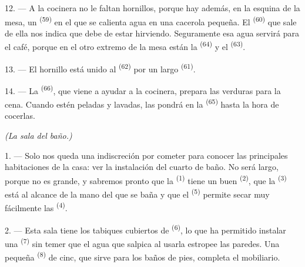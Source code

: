 12. --- A la cocinera no le faltan hornillos, porque hay además, en la
esquina de la mesa, un  \textsuperscript{(59)} en el que se
calienta agua en una cacerola pequeña. El  \textsuperscript{(60)} que
sale de ella nos indica que debe de estar hirviendo. Seguramente esa agua
servirá para el café, porque en el otro extremo de la mesa están la
 \textsuperscript{(64)} y el  \textsuperscript{(63)}.

13. --- El hornillo está unido al  \textsuperscript{(62)} por
un largo  \textsuperscript{(61)}.

14. --- La  \textsuperscript{(66)}, que viene a ayudar a la
cocinera, prepara las verduras para la cena. Cuando estén peladas y
lavadas, las pondrá en la  \textsuperscript{(65)} hasta la hora de
cocerlas.

\VUsaut{4.0mm}
{\centering\fontsize{10.2pt}{10.2pt}\selectfont{} \textit{(La sala del baño.)}\par}
\VUsaut{3.0mm}

1. --- Solo nos queda una indiscreción por cometer para conocer las
principales habitaciones de la casa: ver la instalación del cuarto de
baño. No será largo, porque no es grande, y sabremos pronto que la
 \textsuperscript{(1)} tiene un buen 
\textsuperscript{(2)}, que la  \textsuperscript{(3)} está al alcance de la
mano del que se baña y que el  \textsuperscript{(5)} permite secar
muy fácilmente las  \textsuperscript{(4)}.

2. --- Esta sala tiene los tabiques cubiertos de 
\textsuperscript{(6)}, lo que ha permitido instalar una 
\textsuperscript{(7)} sin temer que el agua que salpica al usarla estropee las
paredes. Una pequeña  \textsuperscript{(8)} de cinc, que sirve
para los baños de pies, completa el mobiliario.
\VUsaut{6.0mm}
\VUfilet{22mm}
